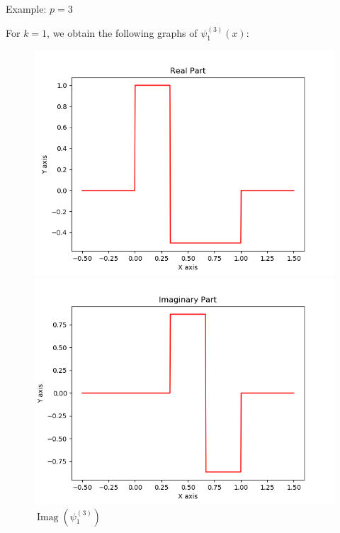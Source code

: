 \documentclass[hyperref, notheorems]{beamer}
\DeclareMathOperator{\Real}{\mathrm{Real}}
\DeclareMathOperator{\Imag}{\mathrm{Imag}}
\theoremstyle{definition}
\begin{document}
\begin{frame}{Example: $p = 3$}

For $k = 1$, we obtain the following graphs of $\psi_1^{(3)}(x)$:

\begin{figure}[!tbp]
  \centering
  \begin{minipage}[b]{0.45\textwidth}
    \includegraphics[width=\textwidth]{graphics/real_1.png}
    \caption{$\Real(\psi^{(3)}_1)$}
  \end{minipage}
  \hfill
  \begin{minipage}[b]{0.45\textwidth}
    \includegraphics[width=\textwidth]{graphics/imag_1.png}
    \caption{$\Imag(\psi^{(3)}_1)$}
  \end{minipage}
\end{figure}
\end{frame}
\end{document}
